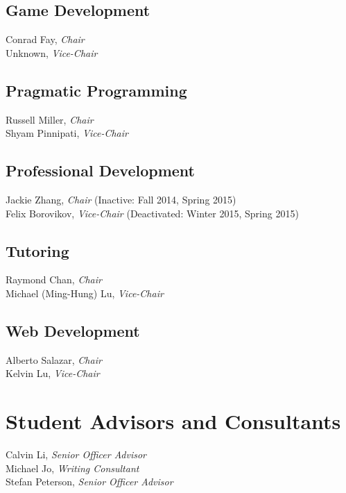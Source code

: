 \documentclass[10pt]{article}
\newcommand{\chair}[1]{#1, \textit{Chair}}
\newcommand{\vicechair}[1]{#1, \textit{Vice-Chair}}
\begin{document}
\subsection{Game Development}

\chair{Conrad Fay}\\
\vicechair{Unknown}

\subsection{Pragmatic Programming}

\chair{Russell Miller}\\
\vicechair{Shyam Pinnipati}

\subsection{Professional Development}

\chair{Jackie Zhang} (Inactive: Fall 2014, Spring 2015)\\
\vicechair{Felix Borovikov} (Deactivated: Winter 2015, Spring 2015) 

\subsection{Tutoring}

\chair{Raymond Chan}\\
\vicechair{Michael (Ming-Hung) Lu}


\subsection{Web Development}

\chair{Alberto Salazar}\\
\vicechair{Kelvin Lu}

\section{Student Advisors and Consultants}

Calvin Li, \textit{Senior Officer Advisor}\\
Michael Jo, \textit{Writing Consultant}\\
Stefan Peterson, \textit{Senior Officer Advisor}
\end{document}

